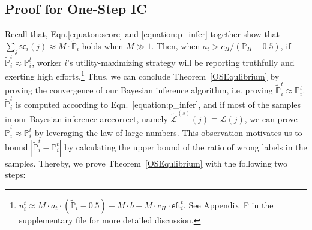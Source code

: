 \subsection{Proof for One-Step IC}
Recall that, Eqn.\ref{equaton:score} and \ref{equation:p_infer} together show that $\sum_j \textsf{sc}_i(j)\approx M\cdot \tilde{\mathbb{P}}_i$ holds when $M\gg 1$. Then, when $a_t>c_H/(\mathbb{P}_H-0.5)$, if $\tilde{\mathbb{P}}^t_i\approx \mathbb{P}^t_i$, worker $i$'s utility-maximizing strategy will be reporting truthfully and exerting high efforts.\footnote{$u_i^t\approx  M\cdot a_t\cdot (\tilde{\mathbb{P}}_i-0.5) + M\cdot b- M \cdot c_H\cdot \textsf{eft}^{t}_i$. See Appendix~F in the supplementary file for more detailed discussion. 
}
Thus, we can conclude Theorem~\ref{OSEqulibrium} by proving the convergence of our Bayesian inference algorithm, i.e. proving $\tilde{\mathbb{P}}^t_i\approx \mathbb{P}^t_i$.
$\tilde{\mathbb{P}}^t_i$ is computed according to Eqn.~\ref{equation:p_infer}, and if most of the samples in our Bayesian inference arecorrect, namely $\tilde{\mathcal{L}}^{(s)}(j)\equiv\mathcal{L}(j)$, we can prove $\tilde{\mathbb{P}}^t_i\approx \mathbb{P}^t_i$ by leveraging the law of large numbers.
This observation motivates us to bound $|\tilde{\mathbb{P}}^t_i-\mathbb{P}^t_i|$ by calculating the upper bound of the ratio of wrong labels in the samples.
Thereby, we prove Theorem~\ref{OSEqulibrium} with the following two steps:

